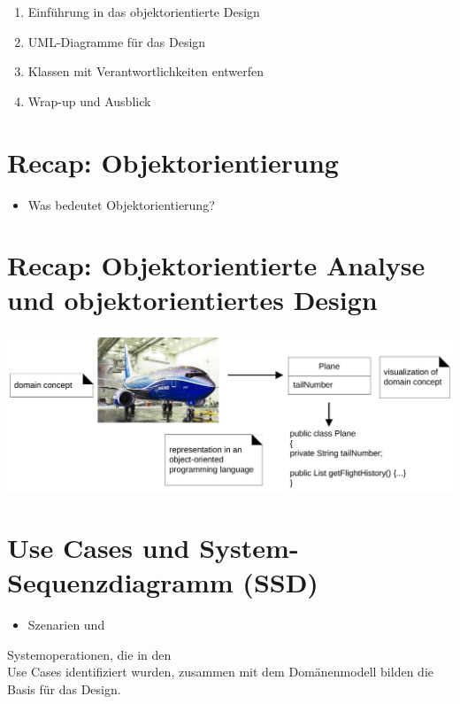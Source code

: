 \documentclass[10pt]{article}
\begin{document}
\begin{enumerate}
  \item Einführung in das objektorientierte Design
  \item UML-Diagramme für das Design
  \item Klassen mit Verantwortlichkeiten entwerfen
  \item Wrap-up und Ausblick
\end{enumerate}

\section*{Recap: Objektorientierung}
\begin{itemize}
  \item Was bedeutet Objektorientierung?
\end{itemize}

\section*{Recap: Objektorientierte Analyse und objektorientiertes Design}
\begin{center}
\includegraphics[max width=\textwidth]{2025_01_02_787afb9584031d2940deg-06}
\end{center}

\section*{Use Cases und System-Sequenzdiagramm (SSD)}
\begin{itemize}
  \item Szenarien und
\end{itemize}

Systemoperationen, die in den\\
Use Cases identifiziert wurden, zusammen mit dem Domänenmodell bilden die Basis für das Design.
\end{document}
